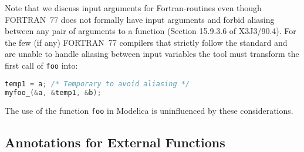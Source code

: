 \begin{example}
Note that we discuss input arguments for Fortran-routines even
though FORTRAN~77 does not formally have input arguments and forbid
aliasing between any pair of arguments to a function (Section 15.9.3.6
of X3J3/90.4). For the few (if any) FORTRAN~77 compilers that strictly
follow the standard and are unable to handle aliasing between input
variables the tool must transform the first call of {\lstinline!foo!} into:
\begin{lstlisting}[language=C]
temp1 = a; /* Temporary to avoid aliasing */
myfoo_(&a, &temp1, &b);
\end{lstlisting}

The use of the function {\lstinline!foo!} in Modelica is uninfluenced by these considerations.
\end{example}

\subsection{Annotations for External Functions}\label{annotations-for-external-libraries-and-include-files}

